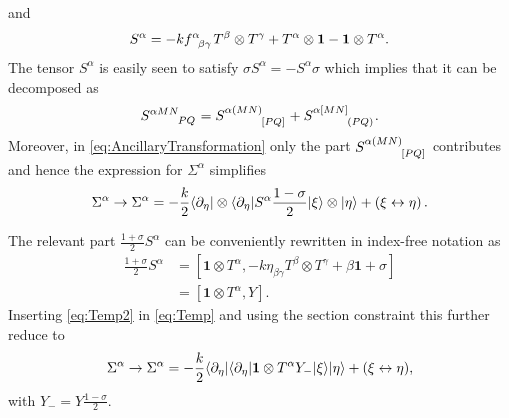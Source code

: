 and 
\begin{equation}\label{eq:STensor}
    S^\alpha = -k\tensor{f}{^{\alpha}_{\beta\gamma}}T^\beta\otimes T^\gamma +T^\alpha\otimes \mathbf{1}-\mathbf{1}\otimes T^\alpha. 
\end{equation}
The tensor $S^\alpha$ is easily seen to satisfy $\sigma S^\alpha = -S^\alpha\sigma$ which implies that it can be decomposed as 
\begin{equation}
    \tensor{S}{^{\alpha MN}_{PQ}} = \tensor{S}{^{\alpha (MN)}_{[PQ]}}+\tensor{S}{^{\alpha [MN]}_{(PQ)}}. 
\end{equation}
Moreover, in \eqref{eq:AncillaryTransformation} only the part $\tensor{S}{^{\alpha (MN)}_{[PQ]}}$ contributes and hence the expression for $\Sigma^\alpha$ simplifies
\begin{equation}\label{eq:Temp}
    \Sigma^\alpha\to \Sigma^\alpha = -\frac{k}{2}\langle \partial_\eta|\otimes\langle \partial_\eta| S^\alpha\frac{1-\sigma}{2}|\xi\rangle \otimes |\eta\rangle + \left(\xi\leftrightarrow\eta\right).
\end{equation}

The relevant part $\frac{1+\sigma}{2}S^\alpha$ can be conveniently rewritten in index-free notation as
\begin{equation}\label{eq:Temp2}
    \begin{aligned}
        \frac{1+\sigma}{2}S^\alpha &= [\mathbf{1}\otimes T^\alpha,-k\eta_{\beta\gamma}T^\beta\otimes T^\gamma+\beta\mathbf{1}+\sigma]\\
        &= [\mathbf{1}\otimes T^\alpha,Y].
    \end{aligned}
\end{equation}
Inserting \eqref{eq:Temp2} in \eqref{eq:Temp} and using the section constraint this further reduce to 
\begin{equation}
    \Sigma^\alpha \to \Sigma^\alpha = -\frac{k}{2}\langle\partial_\eta|\langle\partial_\eta |\mathbf{1}\otimes T^\alpha Y_-|\xi\rangle|\eta\rangle+(\xi\leftrightarrow\eta),
\end{equation}
with $Y_- = Y\frac{1-\sigma}{2}$. 

